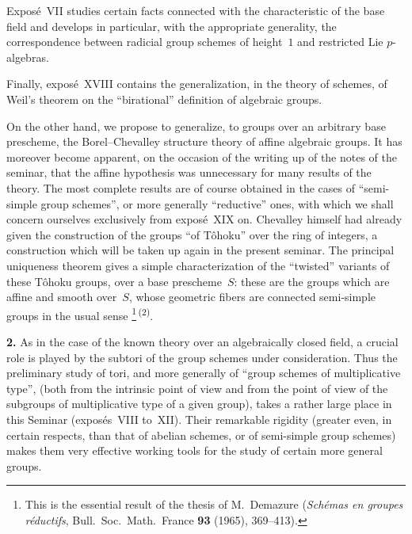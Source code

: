 Expos\'e~VII studies certain facts connected with the characteristic of the
base field and develops in particular, with the appropriate generality, the
correspondence between radicial group schemes of height~\(1\) and restricted
Lie \(p\)-algebras.

Finally, expos\'e~XVIII contains the generalization, in the theory of
schemes, of Weil's theorem on the ``birational'' definition of algebraic
groups.

On the other hand, we propose to generalize, to groups over an arbitrary
base prescheme, the Borel--Chevalley structure theory of affine algebraic
groups. It has moreover become apparent, on the occasion of the writing up
of the notes of the seminar, that the affine hypothesis was unnecessary for
many results of the theory. The most complete results are of course obtained
in the cases of ``semi-simple group schemes'', or more generally
``reductive'' ones, with which we shall concern ourselves exclusively from
expos\'e~XIX on. Chevalley himself had already given the construction of the
groups ``of T\^ohoku'' over the ring of integers, a construction which will
be taken up again in the present seminar. The principal uniqueness
theorem%
{\renewcommand{\thefootnote}{(2)}}
gives a simple characterization of the ``twisted'' variants of these T\^ohoku
groups, over a base prescheme~$S$: these are the groups which are affine and
smooth over~$S$, whose geometric fibers are connected semi-simple groups in
the usual sense%
{\renewcommand{\thefootnote}{(***)}\footnote{This is the essential result of
the thesis of M.~Demazure (\emph{Sch\'emas en groupes r\'eductifs}, Bull.\
Soc.\ Math.\ France \textbf{93} (1965), 369--413).}}\,\textsuperscript{(2)}.

\par{}
\noindent\textbf{2.}\label{Intro.sec.2}
As in the case of the known theory over an algebraically closed field, a
crucial role is played by the subtori of the group schemes under
consideration. Thus the preliminary study of tori, and more generally of
``group schemes of multiplicative type'', (both from the intrinsic point of
view and from the point of view of the subgroups of multiplicative type of a
given group), takes a rather large place in this Seminar
(expos\'es~VIII to~XII). Their remarkable rigidity (greater even, in certain
respects, than that of abelian schemes, or of semi-simple group schemes)
makes them very effective working tools for the study of certain more
general groups.

